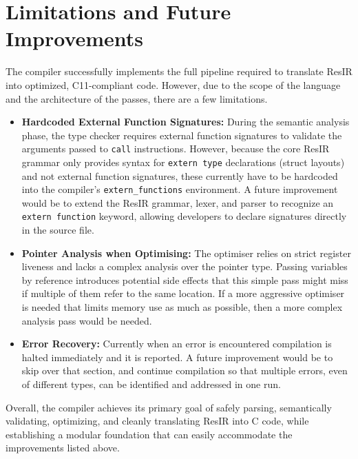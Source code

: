 \documentclass[11pt, a4paper]{article}
\begin{document}
\bigskip

\section{Limitations and Future Improvements}

The compiler successfully implements the full pipeline required to translate ResIR into optimized, C11-compliant code. However, due to the scope of the language and the architecture of the passes, there are a few limitations.

\begin{itemize}
    \item \textbf{Hardcoded External Function Signatures:} During the semantic analysis phase, the type checker requires external function signatures to validate the arguments passed to \texttt{call} instructions. However, because the core ResIR grammar only provides syntax for \texttt{extern type} declarations (struct layouts) and not external function signatures, these currently have to be hardcoded into the compiler's \texttt{extern\_functions} environment. A future improvement would be to extend the ResIR grammar, lexer, and parser to recognize an \texttt{extern function} keyword, allowing developers to declare signatures directly in the source file.
    \item \textbf{Pointer Analysis when Optimising:} The optimiser relies on strict register liveness and lacks a complex analysis over the pointer type. Passing variables by reference introduces potential side effects that this simple pass might miss if multiple of them refer to the same location. If a more aggressive optimiser is needed that limits memory use as much as possible, then a more complex analysis pass would be needed.
    \item \textbf{Error Recovery:} Currently when an error is encountered compilation is halted immediately and it is reported. A future improvement would be to skip over that section, and continue compilation so that multiple errors, even of different types, can be identified and addressed in one run.
\end{itemize}

\medskip

Overall, the compiler achieves its primary goal of safely parsing, semantically validating, optimizing, and cleanly translating ResIR into C code, while establishing a modular foundation that can easily accommodate the improvements listed above.
\end{document}
